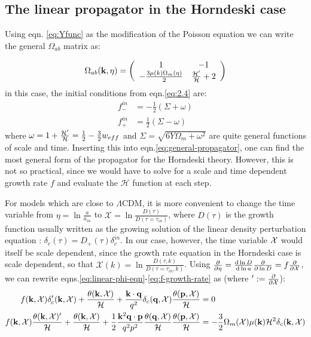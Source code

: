 \subsection{The linear propagator in the Horndeski case}

Using eqn. \ref{eq:Yfunc} as the modification of the Poisson equation
we can write the general $\Omega_{ab}$ matrix as:

\begin{equation}
\Omega_{ab}(\mathbf{k},\eta)=\left(\begin{array}{cc}
1 & -1\\
-\frac{3\mu(k)\Omega_{m}(\eta)}{2} & \frac{\mathcal{H}'}{\mathcal{H}}+2
\end{array}\right)
\end{equation}
in this case, the initial conditions from eqn.\ref{eq:2.4} are: 
\begin{equation}
\begin{aligned}f_{-}^{in} & =-\frac{1}{2}(\Sigma+\omega)\\
f_{+}^{in} & =\frac{1}{2}(\Sigma-\omega)
\end{aligned}
\end{equation}
where $\omega=1+\frac{\mathcal{H}'}{\mathcal{H}}=\frac{1}{2}-\frac{3}{2}w_{eff}$
and $\Sigma=\sqrt{6Y\Omega_{m}+\omega^{2}}$ are quite general functions
of scale and time. Inserting this into eqn.\ref{eq:general-propagator},
one can find the most general form of the propagator for the Horndeski
theory. However, this is not so practical, since we would have to
solve for a scale and time dependent growth rate $f$ and evaluate
the $\mathcal{H}$ function at each step.

For models which are close to $\Lambda\textrm{CDM}$, it is more convenient
to change the time variable from $\eta=\ln\frac{a}{a_{in}}$ to $\mathcal{X}=\ln\frac{D(\tau)}{D(\tau=\tau_{in})}$,
where $D(\tau)$ is the growth function usually written as the growing
solution of the linear density perturbation equation : $\delta_{c}(\tau)=D_{+}(\tau)\delta_{c}^{in}$.
In our case, however, the time variable $\mathcal{X}$ would itself be
scale dependent, since the growth rate equation in the Horndeski case
is scale dependent, so that $\mathcal{X}(k)=\ln\frac{D(\tau,k)}{D(\tau=\tau_{in},k)}$.
Using $\frac{\partial}{\partial\eta}=\frac{\mathrm{d}\ln D}{\mathrm{d}\ln a}\frac{\partial}{\partial\ln D}=f\frac{\partial}{\partial\mathcal{X}}$,
we can rewrite eqns.\ref{eq:linear-phi-eqn}-\ref{eq:f-growth-rate}
as (where $':=\frac{\partial}{\partial\mathcal{X}}$): 
\begin{align}
f(\mathbf{k},\mathcal{X})\delta'_{c}(\mathbf{k},\mathcal{X})+\frac{\theta(\mathbf{k},\mathcal{X})}{\mathcal{H}}+\frac{\mathbf{k}\cdot\mathbf{q}}{q^{2}}\delta_{c}(\mathbf{q},\mathcal{X})\frac{\theta(\mathbf{p},\mathcal{X})}{\mathcal{H}} & =0\label{eq:fg-rate-1}\\
f(\mathbf{k},\mathcal{X})\frac{\theta(\mathbf{k},\mathcal{X})'}{\mathcal{H}}+\frac{\theta(\mathbf{k},\mathcal{X})}{\mathcal{H}}+\frac{1}{2}\frac{\mathbf{k}^{2}\mathbf{q}\cdot\mathbf{p}}{q^{2}p^{2}}\frac{\theta(\mathbf{q},\mathcal{X})}{\mathcal{H}}\frac{\theta(\mathbf{p,\mathcal{X}})}{\mathcal{H}} & =-\frac{3}{2}\Omega_{m}(\mathcal{X})\mu(\mathbf{k})\mathcal{H}^{2}\delta_{c}(\mathbf{k},\mathcal{X})\label{eq:fg-rate-2}
\end{align}



